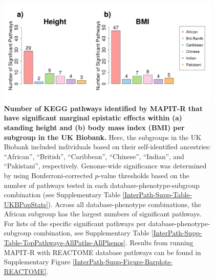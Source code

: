 \documentclass[10pt]{article}
\begin{document}
\begin{figure}[htb]
\centering
\includegraphics[width=\textwidth]{Images/Main/InterPath_Main_Figure_Barplots_KEGG_vs4.png}
\caption{\textbf{Number of KEGG pathways identified by MAPIT-R that have significant marginal epistatic effects within (a) standing height and (b) body mass index (BMI) per subgroup in the UK Biobank.} Here, the subgroups in the UK Biobank included individuals based on their self-identified ancestries: ``African'', ``British'', ``Caribbean'', ``Chinese'', ``Indian'', and ``Pakistani'', respectively. Genome-wide significance was determined by using Bonferroni-corrected $p$-value thresholds based on the number of pathways tested in each database-phenotype-subgroup combination (see Supplementary Table \ref{InterPath-Supp-Table-UKBPopStats}). Across all database-phenotype combinations, the African subgroup has the largest numbers of significant pathways. For lists of the specific significant pathways per database-phenotype-subgroup combination, see Supplementary Table \ref{InterPath-Supp-Table-TopPathways-AllPaths-AllPhenos}. Results from running MAPIT-R with REACTOME database pathways can be found in Supplementary Figure \ref{InterPath-Supp-Figure-Barplots-REACTOME}.}
\label{InterPath-Main-Figure-Barplots-KEGG}
\end{figure}

\end{document}

